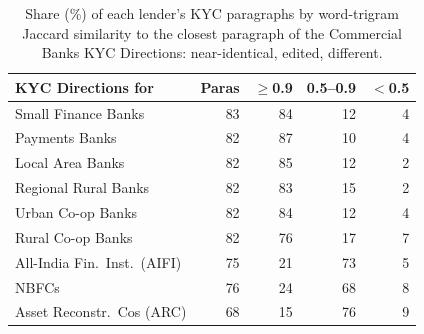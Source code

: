 \begin{table}[t]\centering\small\setlength{\tabcolsep}{3pt}
\begin{tabular}{lrrrr}\toprule
KYC Directions for & Paras & $\geq$0.9 & 0.5--0.9 & $<$0.5\\\midrule
Small Finance Banks & 83 & 84 & 12 & 4\\
Payments Banks & 82 & 87 & 10 & 4\\
Local Area Banks & 82 & 85 & 12 & 2\\
Regional Rural Banks & 82 & 83 & 15 & 2\\
Urban Co-op Banks & 82 & 84 & 12 & 4\\
Rural Co-op Banks & 82 & 76 & 17 & 7\\
All-India Fin.\ Inst.\ (AIFI) & 75 & 21 & 73 & 5\\
NBFCs & 76 & 24 & 68 & 8\\
Asset Reconstr.\ Cos (ARC) & 68 & 15 & 76 & 9\\
\bottomrule\end{tabular}
\caption{Share (\%) of each lender's KYC paragraphs by word-trigram Jaccard similarity to the closest paragraph of the Commercial Banks KYC Directions: near-identical, edited, different.}\label{tab:nearcopy}
\end{table}
